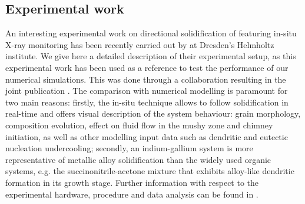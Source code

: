 \subsection{Experimental work}  \label{sec:freckle_exp}

An interesting experimental work on directional solidification of 
featuring in-situ X-ray monitoring has been recently carried out by \citet{shevchenko_chimney_2013} at Dresden's Helmholtz institute.
We give here a detailed description of their experimental setup, as this experimental work has been used as a reference to test the performance
of our numerical simulations. This was done through a collaboration resulting in the joint publication \citep{saad_simulation_2015}.
The comparison with numerical modelling is paramount for two main reasons: firstly, the in-situ technique allows to follow solidification in real-time 
and offers visual description of the system behaviour: grain morphology, composition evolution, effect on fluid flow in the 
mushy zone and chimney initiation, as well as other modelling input data such as dendritic and eutectic nucleation undercooling; 
secondly, an indium-gallium system is more representative of metallic alloy solidification than the widely used organic systems, 
e.g. the succinonitrile-acetone mixture that exhibits alloy-like dendritic formation in its growth stage. Further information with respect 
to the experimental hardware, procedure and data analysis can be found in \citep{boden_x-ray_2008,shevchenko_chimney_2013}.

